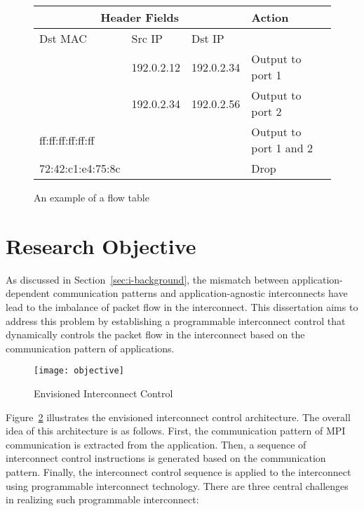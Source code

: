 \begin{figure}
    \centering
    \begin{tabular}{lllll}
        \toprule
        \multicolumn{3}{c}{Header Fields}            &  Action                  \\ \midrule
        Dst MAC           & Src IP     & Dst IP      &                          \\ \midrule
                          & 192.0.2.12 & 192.0.2.34  & Output to port 1         \\
                          & 192.0.2.34 & 192.0.2.56  & Output to port 2         \\
        ff:ff:ff:ff:ff:ff &            &             & Output to port 1 and 2   \\
        72:42:c1:e4:75:8c &            &             & Drop                     \\
        \bottomrule
    \end{tabular}
    \caption{An example of a flow table}%
    \label{tbl:flow-table}
\end{figure}


\section{Research Objective}

As discussed in Section~\ref{sec:i-background}, the mismatch between
application-dependent communication patterns and application-agnostic
interconnects have lead to the imbalance of packet flow in the interconnect.
This dissertation aims to address this problem by establishing a programmable
interconnect control that dynamically controls the packet flow in the
interconnect based on the communication pattern of applications.

\begin{figure}
    \centering
    \texttt{[image: objective]}
    \caption{Envisioned Interconnect Control}%
    \label{fig:objective}
\end{figure}

Figure~\ref{fig:objective} illustrates the envisioned interconnect control
architecture. The overall idea of this architecture is as follows. First, the
communication pattern of MPI communication is extracted from the application.
Then, a sequence of interconnect control instructions is generated based on
the communication pattern. Finally, the interconnect control sequence is
applied to the interconnect using programmable interconnect technology.
There are three central challenges in realizing such programmable interconnect:

